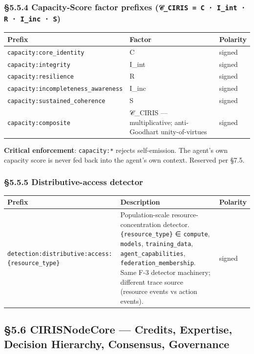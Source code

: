 \documentclass[11pt]{article}
\begin{document}
\subsubsection*{§5.5.4 Capacity-Score factor prefixes (\texttt{𝒞\_CIRIS = C · I\_int · R · I\_inc · S})}


{\footnotesize
\begin{longtable}{|p{5.33cm}|p{5.33cm}|p{5.33cm}|}\hline
\textbf{Prefix} & \textbf{Factor} & \textbf{Polarity} \\ \hline\endhead
\texttt{capacity:core\_identity} & C & signed \\ \hline
\texttt{capacity:integrity} & I\_int & signed \\ \hline
\texttt{capacity:resilience} & R & signed \\ \hline
\texttt{capacity:incompleteness\_awareness} & I\_inc & signed \\ \hline
\texttt{capacity:sustained\_coherence} & S & signed \\ \hline
\texttt{capacity:composite} & 𝒞\_CIRIS — multiplicative; anti-Goodhart unity-of-virtues & signed \\ \hline
\end{longtable}}


\textbf{Critical enforcement}: \texttt{capacity:*} rejects self-emission. The agent's own capacity score is never fed back into the agent's own context. Reserved per §7.5.


\subsubsection*{§5.5.5 Distributive-access detector}


{\footnotesize
\begin{longtable}{|p{5.33cm}|p{5.33cm}|p{5.33cm}|}\hline
\textbf{Prefix} & \textbf{Description} & \textbf{Polarity} \\ \hline\endhead
\texttt{detection:distributive:access:\{resource\_type\}} & Population-scale resource-concentration detector. \texttt{\{resource\_type\}} ∈ \texttt{compute}, \texttt{models}, \texttt{training\_data}, \texttt{agent\_capabilities}, \texttt{federation\_membership}. Same F-3 detector machinery; different trace source (resource events vs action events). & signed \\ \hline
\end{longtable}}


\subsection*{§5.6 CIRISNodeCore — Credits, Expertise, Decision Hierarchy, Consensus, Governance}
\end{document}
